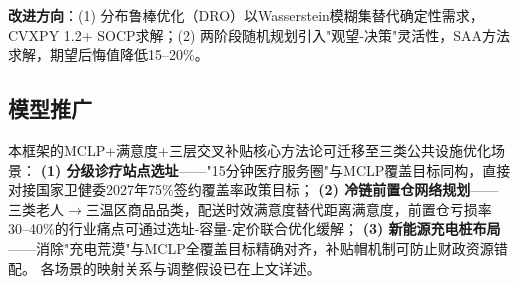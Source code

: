 \textbf{改进方向}：(1) 分布鲁棒优化（DRO）以Wasserstein模糊集替代确定性需求，CVXPY 1.2+ SOCP求解；(2) 两阶段随机规划引入"观望-决策"灵活性，SAA方法求解，期望后悔值降低15--20\%。

\subsection{模型推广}

本框架的MCLP+满意度+三层交叉补贴核心方法论可迁移至三类公共设施优化场景：
\textbf{(1) 分级诊疗站点选址}——"15分钟医疗服务圈"与MCLP覆盖目标同构，直接对接国家卫健委2027年75\%签约覆盖率政策目标；
\textbf{(2) 冷链前置仓网络规划}——三类老人$\to$三温区商品品类，配送时效满意度替代距离满意度，前置仓亏损率30--40\%的行业痛点可通过选址-容量-定价联合优化缓解；
\textbf{(3) 新能源充电桩布局}——消除"充电荒漠"与MCLP全覆盖目标精确对齐，补贴帽机制可防止财政资源错配。
各场景的映射关系与调整假设已在上文详述。
